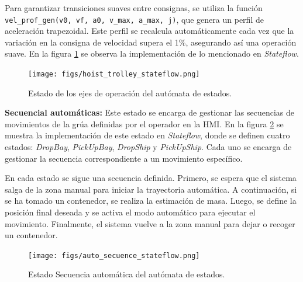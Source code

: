 \documentclass{article}
\begin{document}
            Para garantizar transiciones suaves entre consignas, se utiliza la función \texttt{vel\_prof\_gen(v0, vf, a0, v\_max, a\_max, j)}, que genera un perfil de aceleración trapezoidal. Este perfil se recalcula automáticamente cada vez que la variación en la consigna de velocidad supera el 1\%, asegurando así una operación suave.
            En la figura \ref{fig:operation_axes_stateflow} se observa la implementación de lo mencionado en \textit{Stateflow}.

            \begin{figure} [H]
                \centering
                \texttt{[image: figs/hoist\_trolley\_stateflow.png]}
                \caption{Estado de los ejes de operación del autómata de estados.}
                \label{fig:operation_axes_stateflow}
            \end{figure}

        \textbf{Secuencial automáticas:}
            Este estado se encarga de gestionar las secuencias de movimientos de la grúa definidas por el operador en la HMI. En la figura \ref{fig:auto_secuence_stateflow} se muestra la implementación de este estado en \textit{Stateflow}, donde se definen cuatro estados: \textit{DropBay}, \textit{PickUpBay}, \textit{DropShip} y \textit{PickUpShip}. Cada uno se encarga de gestionar la secuencia correspondiente a un movimiento específico.

            En cada estado se sigue una secuencia definida. Primero, se espera que el sistema salga de la zona manual para iniciar la trayectoria automática. A continuación, si se ha tomado un contenedor, se realiza la estimación de masa. Luego, se define la posición final deseada y se activa el modo automático para ejecutar el movimiento. Finalmente, el sistema vuelve a la zona manual para dejar o recoger un contenedor.

            \begin{figure} [H]
                \centering
                \texttt{[image: figs/auto\_secuence\_stateflow.png]}
                \caption{Estado Secuencia automática del autómata de estados.}
                \label{fig:auto_secuence_stateflow}
            \end{figure}
\end{document}
